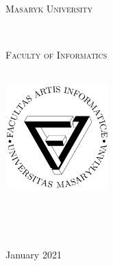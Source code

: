 \begin{titlepage}

  \vspace*{1.5cm}
  \makeatletter

  \begin{center}
    \begin{LARGE}
      \textsc{Masaryk University}
    \end{LARGE}\\
    \begin{Large}
      \textsc{Faculty of Informatics}
    \end{Large}\\[1cm]
    \includegraphics[width=4cm, height=4cm] {fi_logo.pdf}\\[2cm]
    \begin{Huge}
      \@title
    \end{Huge}\\[1.25cm]
    \begin{Large}
      \@subtitle
    \end{Large}\\[1.5cm]
    \begin{LARGE}
      \@author
    \end{LARGE}
    \vfill
    {\hfill\large January 2021}
  \end{center}
  \makeatother
\end{titlepage}

\newpage
\null
\thispagestyle{empty}
\newpage
